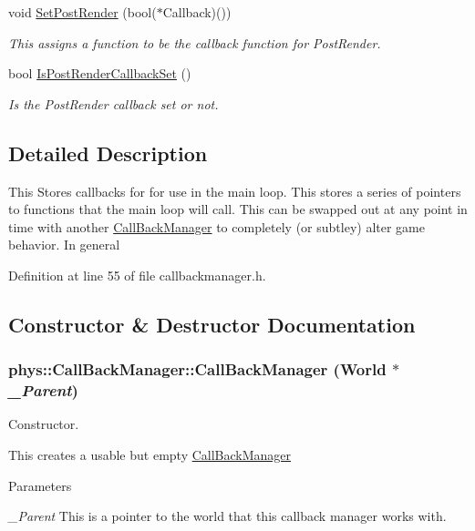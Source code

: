 \begin{DoxyCompactItemize}
void \hyperlink{classphys_1_1CallBackManager_afe6a91491f3872599d2c5784a902361a}{SetPostRender} (bool($\ast$Callback)())
\begin{DoxyCompactList}\small\item\em This assigns a function to be the callback function for PostRender. \item\end{DoxyCompactList}\item 
bool \hyperlink{classphys_1_1CallBackManager_a13011f2f9ffd561255772bc4082b304f}{IsPostRenderCallbackSet} ()
\begin{DoxyCompactList}\small\item\em Is the PostRender callback set or not. \item\end{DoxyCompactList}\end{DoxyCompactItemize}


\subsection{Detailed Description}
This Stores callbacks for for use in the main loop. This stores a series of pointers to functions that the main loop will call. This can be swapped out at any point in time with another \hyperlink{classphys_1_1CallBackManager}{CallBackManager} to completely (or subtley) alter game behavior. In general 

Definition at line 55 of file callbackmanager.h.



\subsection{Constructor \& Destructor Documentation}
\hypertarget{classphys_1_1CallBackManager_a16d4c60beef774ae904cf01853d71aae}{
\subsubsection[{CallBackManager}]{\setlength{\rightskip}{0pt plus 5cm}phys::CallBackManager::CallBackManager ({\bf World} $\ast$ {\em \_\-Parent})}}
\label{d1/d47/classphys_1_1CallBackManager_a16d4c60beef774ae904cf01853d71aae}


Constructor. 

This creates a usable but empty \hyperlink{classphys_1_1CallBackManager}{CallBackManager} 
\begin{DoxyParams}{Parameters}
\item[{\em \_\-Parent}]This is a pointer to the world that this callback manager works with. \end{DoxyParams}



